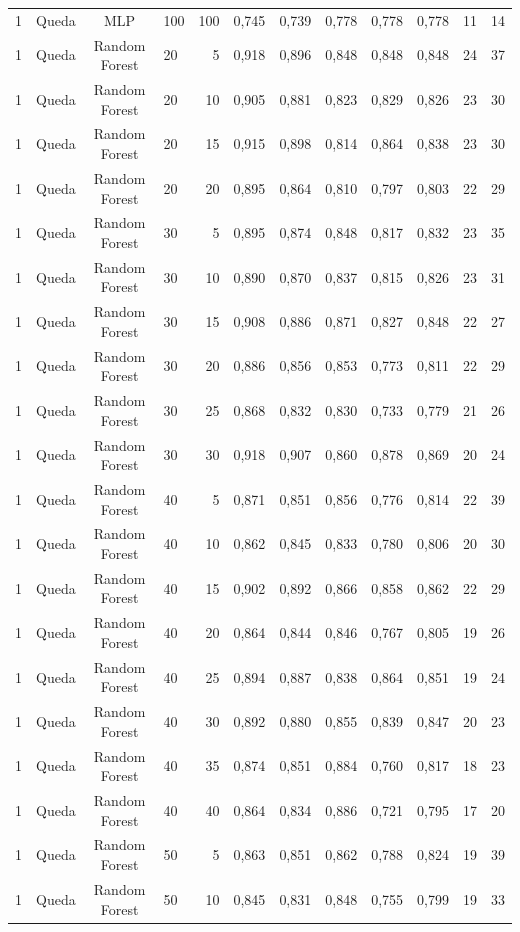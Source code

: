 \begin{longtable}{ccclrrrrrrrr}
1 & Queda & MLP & 100 & 100 & 0,745 & 0,739 & 0,778 & 0,778 & 0,778 & 11 & 14 \\
1 & Queda & Random Forest & 20 & 5 & 0,918 & 0,896 & 0,848 & 0,848 & 0,848 & 24 & 37 \\
1 & Queda & Random Forest & 20 & 10 & 0,905 & 0,881 & 0,823 & 0,829 & 0,826 & 23 & 30 \\
1 & Queda & Random Forest & 20 & 15 & 0,915 & 0,898 & 0,814 & 0,864 & 0,838 & 23 & 30 \\
1 & Queda & Random Forest & 20 & 20 & 0,895 & 0,864 & 0,810 & 0,797 & 0,803 & 22 & 29 \\
1 & Queda & Random Forest & 30 & 5 & 0,895 & 0,874 & 0,848 & 0,817 & 0,832 & 23 & 35 \\
1 & Queda & Random Forest & 30 & 10 & 0,890 & 0,870 & 0,837 & 0,815 & 0,826 & 23 & 31 \\
1 & Queda & Random Forest & 30 & 15 & 0,908 & 0,886 & 0,871 & 0,827 & 0,848 & 22 & 27 \\
1 & Queda & Random Forest & 30 & 20 & 0,886 & 0,856 & 0,853 & 0,773 & 0,811 & 22 & 29 \\
1 & Queda & Random Forest & 30 & 25 & 0,868 & 0,832 & 0,830 & 0,733 & 0,779 & 21 & 26 \\
1 & Queda & Random Forest & 30 & 30 & 0,918 & 0,907 & 0,860 & 0,878 & 0,869 & 20 & 24 \\
1 & Queda & Random Forest & 40 & 5 & 0,871 & 0,851 & 0,856 & 0,776 & 0,814 & 22 & 39 \\
1 & Queda & Random Forest & 40 & 10 & 0,862 & 0,845 & 0,833 & 0,780 & 0,806 & 20 & 30 \\
1 & Queda & Random Forest & 40 & 15 & 0,902 & 0,892 & 0,866 & 0,858 & 0,862 & 22 & 29 \\
1 & Queda & Random Forest & 40 & 20 & 0,864 & 0,844 & 0,846 & 0,767 & 0,805 & 19 & 26 \\
1 & Queda & Random Forest & 40 & 25 & 0,894 & 0,887 & 0,838 & 0,864 & 0,851 & 19 & 24 \\
1 & Queda & Random Forest & 40 & 30 & 0,892 & 0,880 & 0,855 & 0,839 & 0,847 & 20 & 23 \\
1 & Queda & Random Forest & 40 & 35 & 0,874 & 0,851 & 0,884 & 0,760 & 0,817 & 18 & 23 \\
1 & Queda & Random Forest & 40 & 40 & 0,864 & 0,834 & 0,886 & 0,721 & 0,795 & 17 & 20 \\
1 & Queda & Random Forest & 50 & 5 & 0,863 & 0,851 & 0,862 & 0,788 & 0,824 & 19 & 39 \\
1 & Queda & Random Forest & 50 & 10 & 0,845 & 0,831 & 0,848 & 0,755 & 0,799 & 19 & 33 \\

\end{longtable}

